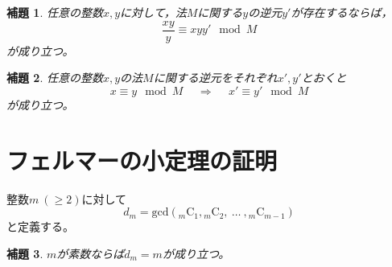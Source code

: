 \documentclass{article}
\makeatletter
\renewenvironment{proof}[1][\proofname]{\par
    \pushQED{\qed}
    \normalfont
    \topsep6\p@\@plus6\p@ \trivlist
    \item[\hskip\labelsep{\bfseries #1}\@addpunct{\bfseries}]\ignorespaces
}{%
    \popQED\endtrivlist\@endpefalse
}
\renewcommand{\proofname}{証明.}
\newtheorem{lemma}{補題}
\newcommand{\combination}[2]{{}_{#1} \mathrm{C}_{#2}}
\makeatother
\begin{document}
\begin{proof}

\end{proof}

\begin{screen}
    \begin{lemma}
        \label{lemma:inv:2}
        任意の整数$x, y$に対して，法$M$に関する$y$の逆元$y'$が存在するならば，
        \begin{equation*}
            \frac{xy}{y} \equiv xyy' \mod{M}
        \end{equation*}
        が成り立つ。
    \end{lemma}
\end{screen}

\begin{proof}

\end{proof}

\begin{screen}
    \begin{lemma}
        \label{lemma:inv:3}
        任意の整数$x, y$の法$M$に関する逆元をそれぞれ$x', y'$とおくと
        \begin{equation*}
            x \equiv y \mod{M}
            \hspace{15pt} \Longrightarrow \hspace{15pt}
            x' \equiv y' \mod{M}
        \end{equation*}
        が成り立つ。
    \end{lemma}
\end{screen}

\begin{proof}

\end{proof}



\section{フェルマーの小定理の証明}

整数$m\ (\geq 2)$に対して
\begin{equation*}
    d_m = \mathrm{gcd} (\combination{m}{1}, \combination{m}{2},\ \ldots\ , \combination{m}{m-1})
\end{equation*}
と定義する。

\begin{screen}
    \begin{lemma}
        \label{lemma:flt:1}
        $m$が素数ならば$d_m = m$が成り立つ。
    \end{lemma}
\end{screen}
\end{document}
